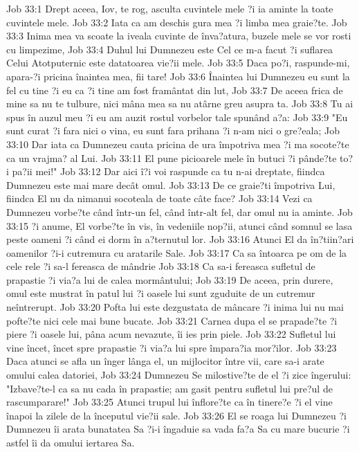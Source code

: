 Job 33:1  Drept aceea, Iov, te rog, asculta cuvintele mele ?i ia aminte la toate cuvintele mele.
Job 33:2  Iata ca am deschis gura mea ?i limba mea graie?te.
Job 33:3  Inima mea va scoate la iveala cuvinte de înva?atura, buzele mele se vor rosti cu limpezime,
Job 33:4  Duhul lui Dumnezeu este Cel ce m-a facut ?i suflarea Celui Atotputernic este datatoarea vie?ii mele.
Job 33:5  Daca po?i, raspunde-mi, apara-?i pricina înaintea mea, fii tare!
Job 33:6  Înaintea lui Dumnezeu eu sunt la fel cu tine ?i eu ca ?i tine am fost framântat din lut,
Job 33:7  De aceea frica de mine sa nu te tulbure, nici mâna mea sa nu atârne greu asupra ta.
Job 33:8  Tu ai spus în auzul meu ?i eu am auzit rostul vorbelor tale spunând a?a:
Job 33:9  "Eu sunt curat ?i fara nici o vina, eu sunt fara prihana ?i n-am nici o gre?eala;
Job 33:10  Dar iata ca Dumnezeu cauta pricina de ura împotriva mea ?i ma socote?te ca un vrajma? al Lui.
Job 33:11  El pune picioarele mele în butuci ?i pânde?te to?i pa?ii mei!"
Job 33:12  Dar aici î?i voi raspunde ca tu n-ai dreptate, fiindca Dumnezeu este mai mare decât omul.
Job 33:13  De ce graie?ti împotriva Lui, fiindca El nu da nimanui socoteala de toate câte face?
Job 33:14  Vezi ca Dumnezeu vorbe?te când într-un fel, când într-alt fel, dar omul nu ia aminte.
Job 33:15  ?i anume, El vorbe?te în vis, în vedeniile nop?ii, atunci când somnul se lasa peste oameni ?i când ei dorm în a?ternutul lor.
Job 33:16  Atunci El da în?tiin?ari oamenilor ?i-i cutremura cu aratarile Sale.
Job 33:17  Ca sa întoarca pe om de la cele rele ?i sa-l fereasca de mândrie
Job 33:18  Ca sa-i fereasca sufletul de prapastie ?i via?a lui de calea mormântului;
Job 33:19  De aceea, prin durere, omul este mustrat în patul lui ?i oasele lui sunt zguduite de un cutremur neîntrerupt.
Job 33:20  Pofta lui este dezgustata de mâncare ?i inima lui nu mai pofte?te nici cele mai bune bucate.
Job 33:21  Carnea dupa el se prapade?te ?i piere ?i oasele lui, pâna acum nevazute, îi ies prin piele.
Job 33:22  Sufletul lui vine încet, încet spre prapastie ?i via?a lui spre împara?ia mor?ilor.
Job 33:23  Daca atunci se afla un înger lânga el, un mijlocitor între vii, care sa-i arate omului calea datoriei,
Job 33:24  Dumnezeu Se milostive?te de el ?i zice îngerului: "Izbave?te-l ca sa nu cada în prapastie; am gasit pentru sufletul lui pre?ul de rascumparare!"
Job 33:25  Atunci trupul lui înflore?te ca în tinere?e ?i el vine înapoi la zilele de la începutul vie?ii sale.
Job 33:26  El se roaga lui Dumnezeu ?i Dumnezeu îi arata bunatatea Sa ?i-i îngaduie sa vada fa?a Sa cu mare bucurie ?i astfel îi da omului iertarea Sa.

